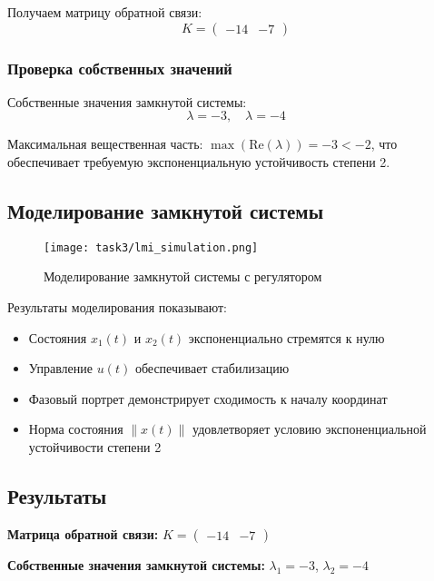 Получаем матрицу обратной связи:
\begin{equation}
K = \begin{pmatrix} -14 & -7 \end{pmatrix}
\end{equation}

\subsubsection*{Проверка собственных значений}

Собственные значения замкнутой системы:
\begin{equation}
\lambda = -3, \quad \lambda = -4
\end{equation}

Максимальная вещественная часть: $\max(\text{Re}(\lambda)) = -3 < -2$, что обеспечивает требуемую экспоненциальную устойчивость степени 2.

\subsection*{Моделирование замкнутой системы}

\begin{figure}[H]
\centering
\texttt{[image: task3/lmi\_simulation.png]}
\caption{Моделирование замкнутой системы с регулятором}
\label{fig:lmi_simulation}
\end{figure}

Результаты моделирования показывают:
\begin{itemize}
\item Состояния $x_1(t)$ и $x_2(t)$ экспоненциально стремятся к нулю
\item Управление $u(t)$ обеспечивает стабилизацию
\item Фазовый портрет демонстрирует сходимость к началу координат
\item Норма состояния $\|x(t)\|$ удовлетворяет условию экспоненциальной устойчивости степени 2
\end{itemize}

\subsection*{Результаты}

\textbf{Матрица обратной связи:} $K = \begin{pmatrix} -14 & -7 \end{pmatrix}$

\textbf{Собственные значения замкнутой системы:} $\lambda_1 = -3$, $\lambda_2 = -4$

